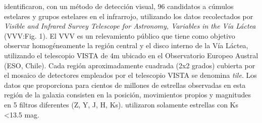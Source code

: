 \documentclass[baaa]{baaa}
\begin{document}
\par
\cite{borissova2011new} identificaron, con un método de detección visual, 96 candidatos a cúmulos estelares y grupos estelares en el infrarrojo, utilizando los datos recolectados por \textit{Visible and Infrared Survey Telescope for Astronomy, Variables in the Vía Láctea} (VVV:Fig. 1). El VVV es un relevamiento público  que tiene como objetivo observar homogéneamente la región central y el disco interno de la Vía Láctea, utilizando el telescopio VISTA de 4m ubicado en el Observatorio Europeo Austral (ESO, Chile). Cada región aproximadamente cuadrada (2x2 grados) cubierta por el mosaico de detectores empleados por el telescopio VISTA se denomina \textit{tile}. 
Los datos que proporciona para cientos de millones de estrellas observadas en esta región de la galaxia consisten en la posición, movimientos propios y magnitudes en 5 filtros diferentes (Z, Y, J, H, Ks).  \cite{borissova2011new}
utilizaron solamente estrellas con Ks \textless 13.5 mag.
\par
\par
\end{document}
